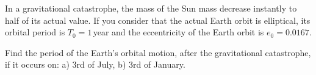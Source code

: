 In a gravitational catastrophe, the mass of the Sun mass decrease instantly to
half of its actual value. If you consider that the actual Earth orbit is
elliptical, its orbital period is $T_0 = 1$\,year and the eccentricity of the
Earth orbit is $e_0 = 0.0167$.

Find the period of the Earth's orbital motion, after the gravitational
catastrophe, if it occurs on: a) 3rd of July, b) 3rd of January.
